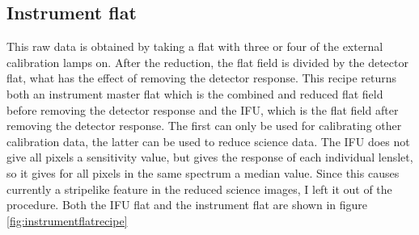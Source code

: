 \documentclass[twoside,single]{lion-msc}
\begin{document}
\subsection{Instrument flat}
This raw data is obtained by taking a flat with three or four of the external calibration lamps on. After the reduction, the flat field is divided by the detector flat, what has the effect of removing the detector response. This recipe returns both an instrument master flat which is the combined and reduced flat field before removing the detector response and the IFU, which is the flat field after removing the detector response. The first can only be used for calibrating other calibration data, the latter can be used to reduce science data. The IFU does not give all pixels a sensitivity value, but gives the response of each individual lenslet, so it gives for all pixels in the same spectrum a median value. Since this causes currently a stripelike feature in the reduced science images, I left it out of the procedure. Both the IFU flat and the instrument flat are shown in figure \ref{fig:instrumentflatrecipe} 
\end{document}
